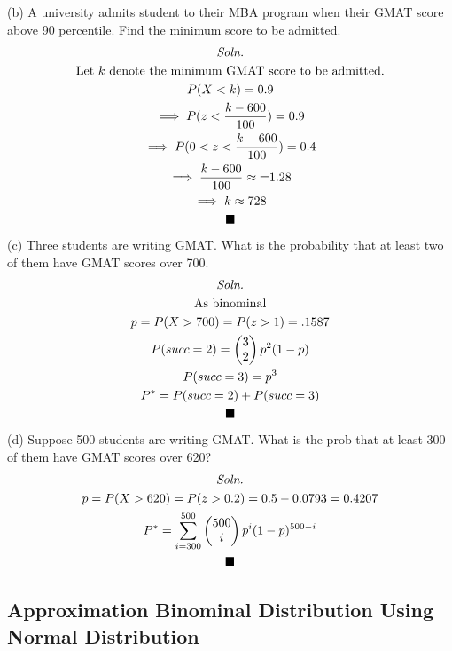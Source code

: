 \documentclass{article}
\begin{document}
		(b) A university admits student to their MBA program when their GMAT score above 90 percentile. Find the minimum score to be admitted.
			\begin{multline*}
				\emph{Soln.} \\
				\text{{Let $k$ denote the minimum GMAT score to be admitted.}} \\
				P(X < k) = 0.9 \\
				\implies P(z < \frac{k - 600}{100}) = 0.9 \\
				\implies P(0 < z < \frac{k - 600}{100}) = 0.4 \\
				\implies \frac{k-600}{100} \approx {= }1.28 \\
				\implies k \approx 728 \\
				\blacksquare
			\end{multline*}
		\newline
		(c) Three students are writing GMAT. What is the probability that at least two of them have GMAT scores over 700.
			\begin{multline*}
				\emph{Soln.} \\
				\text{{As binominal}} \\
				p = P(X > 700) = P(z > 1) = .1587\\
				P(succ=2) = \begin{pmatrix} 3 \\ 2 \end{pmatrix} p^2 (1-p) \\
				P(succ=3) = p^3 \\
				P^* = P(succ=2) + P(succ=3) \\
				\blacksquare
			\end{multline*}
		\newline
		(d) Suppose 500 students are writing GMAT. What is the prob that at least 300 of them have GMAT scores over 620?
			\begin{multline*}
				\emph{Soln.} \\
				p = P(X > 620) = P(z > 0.2) = 0.5 - 0.0793 = 0.4207 \\
				P^* = \sum_{i=300}^{500}{\begin{pmatrix}500 \\ i\end{pmatrix}p^i(1-p)^{500-i}} \\
				\blacksquare
			\end{multline*}

		\subsection{Approximation Binominal Distribution Using Normal Distribution}
\end{document}
